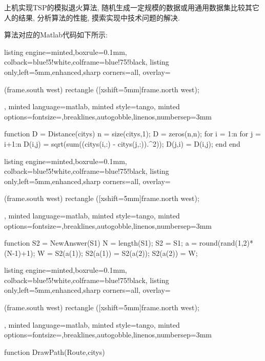 \documentclass{article}
\begin{document}
\pagebreak

\begin{homeworkProblem}
    上机实现TSP的模拟退火算法, 随机生成一定规模的数据或用通用数据集比较其它人的结果, 分析算法的性能, 摸索实现中技术问题的解决.

    \solution 算法对应的Matlab代码如下所示:
\begin{tcblisting}{listing engine=minted,boxrule=0.1mm,
colback=blue!5!white,colframe=blue!75!black,
listing only,left=5mm,enhanced,sharp corners=all,
overlay={\begin{tcbclipinterior} (frame.south west)
rectangle ([xshift=5mm]frame.north west);\end{tcbclipinterior}},
minted language=matlab,
minted style=tango,
minted options={fontsize=\small,breaklines,autogobble,linenos,numbersep=3mm}}
function D = Distance(citys)
n = size(citys,1);
D = zeros(n,n);
for i = 1:n
   for j = i+1:n
       D(i,j) = sqrt(sum((citys(i,:) - citys(j,:)).^2));
       D(j,i) = D(i,j);
   end
end
\end{tcblisting}
\begin{tcblisting}{listing engine=minted,boxrule=0.1mm,
    colback=blue!5!white,colframe=blue!75!black,
    listing only,left=5mm,enhanced,sharp corners=all,
    overlay={\begin{tcbclipinterior} (frame.south west)
    rectangle ([xshift=5mm]frame.north west);\end{tcbclipinterior}},
    minted language=matlab,
    minted style=tango,
    minted options={fontsize=\small,breaklines,autogobble,linenos,numbersep=3mm}}
    function S2 = NewAnswer(S1)
    N = length(S1);
    S2 = S1;                
    a = round(rand(1,2)*(N-1)+1); %
    W = S2(a(1));
    S2(a(1)) = S2(a(2));
    S2(a(2)) = W;         %
\end{tcblisting}
\begin{tcblisting}{listing engine=minted,boxrule=0.1mm,
    colback=blue!5!white,colframe=blue!75!black,
    listing only,left=5mm,enhanced,sharp corners=all,
    overlay={\begin{tcbclipinterior} (frame.south west)
    rectangle ([xshift=5mm]frame.north west);\end{tcbclipinterior}},
    minted language=matlab,
    minted style=tango,
    minted options={fontsize=\small,breaklines,autogobble,linenos,numbersep=3mm}}
    function DrawPath(Route,citys)
    

\end{tcblisting}
\end{homeworkProblem}
\end{document}
